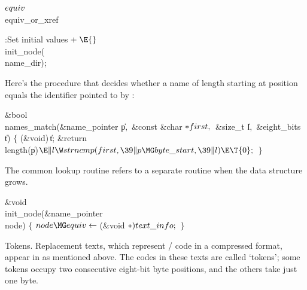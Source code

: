 \Y\B\4\D$\\{equiv}$ \5
\\{equiv\_or\_xref}\par
\fi

\B{}:Set initial values\X${}\mathrel+\E{}$\6
\\{init\_node}(\\{name\_dir});\par
\fi

Here's the procedure that decides whether a name of length 
starting at position  equals the identifier pointed to by :

\Y\B\1\1\&{bool} \\{names\_match}(\&{name\_pointer} \|p${},{}$\6
\&{const} \&{char} ${}{*}\\{first},{}$\6
\&{size\_t} \|l${},{}$\6
\&{eight\_bits} \|t)\2\2\6
${}\{{}$\5
\1(\&{void})\,\|t;\6
\&{return} \\{length}(\|p)${}\E\|l\W\\{strncmp}(\\{first},\39\|p\MG\\{byte%
\_start},\39\|l)\E\T{0};{}$\6
\4${}\}{}$\2\par
\fi

The common lookup routine  refers to a separate
routine
 when the data structure grows.

\Y\B\1\1\&{void} \\{init\_node}(\&{name\_pointer} \\{node})\2\2\6
${}\{{}$\1\6
${}\\{node}\MG\\{equiv}\K{}$(\&{void} ${}{*})\,\\{text\_info};{}$\6
\4${}\}{}$\2\par
\fi

Tokens.
Replacement texts, which represent \CEE/ code in a compressed format,
appear in  as mentioned above. The codes in
these texts are called `tokens'; some tokens occupy two consecutive
eight-bit byte positions, and the others take just one byte.

